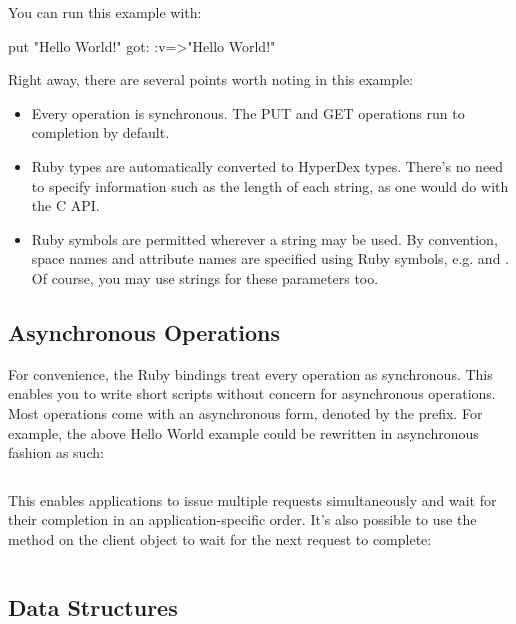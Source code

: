 \inputminted{ruby}{\topdir/ruby/client/hello-world.rb}

You can run this example with:

\begin{consolecode}
put "Hello World!"
got:
{:v=>"Hello World!"}
\end{consolecode}

Right away, there are several points worth noting in this example:

\begin{itemize}
\item Every operation is synchronous.  The PUT and GET operations run to
completion by default.

\item Ruby types are automatically converted to HyperDex types.  There's no need
to specify information such as the length of each string, as one would do with
the C API.

\item Ruby symbols are permitted wherever a string may be used.  By convention,
space names and attribute names are specified using Ruby symbols, e.g.
 and .  Of course, you may use strings for these parameters
too.
\end{itemize}

\subsection{Asynchronous Operations}
\label{sec:api:ruby:async-ops}

For convenience, the Ruby bindings treat every operation as synchronous.  This
enables you to write short scripts without concern for asynchronous operations.
Most operations come with an asynchronous form, denoted by the 
prefix.  For example, the above Hello World example could be rewritten in
asynchronous fashion as such:

\inputminted{ruby}{\topdir/ruby/client/hello-world-async-wait.rb}

This enables applications to issue multiple requests simultaneously and wait for
their completion in an application-specific order.  It's also possible to use
the  method on the client object to wait for the next request to
complete:

\inputminted{ruby}{\topdir/ruby/client/hello-world-async-loop.rb}

\subsection{Data Structures}
\label{sec:api:ruby:data-structures}

